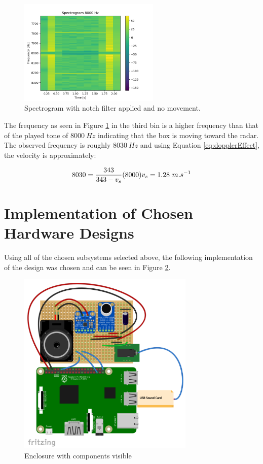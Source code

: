 \begin{figure}[h!]
    \centering
    \includegraphics[width = 0.6\textwidth]{images/notchApplied.pdf}
    \caption{Spectrogram with notch filter applied and no movement.}\label{fig:notchApplied}
\end{figure}

The frequency as seen in Figure \ref{fig:notchApplied} in the third bin is a higher frequency than that of the played tone of $8000\ Hz$ indicating that the box is moving toward the radar. The observed frequency is roughly $8030\ Hz$ and using Equation \ref{eq:dopplerEffect}, the velocity is approximately:

\begin{equation}
8030 = \frac{343}{343-v_s}(8000)\\
v_s = 1.28\ m.s^{-1}
\end{equation}
\section{Implementation of Chosen Hardware Designs}
Using all of the chosen subsystems selected above, the following implementation of the design was chosen and can be seen in Figure \ref{fig:implementationCircuit}.

\begin{figure}[h!]
    \centering
    \includegraphics[width = 0.75\textwidth]{images/implementationCircuit.pdf}
    \caption{Enclosure with components visible}\label{fig:implementationCircuit}
\end{figure}

